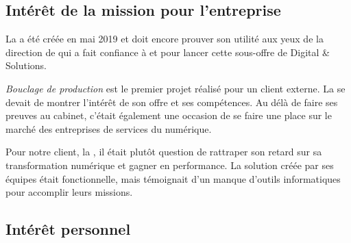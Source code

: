 

\subsection{Intérêt de la mission pour l'entreprise}


La \df a été créée en mai 2019 et doit encore prouver son utilité aux yeux de la direction de \tnp qui a fait confiance à \damien et \gil pour lancer cette sous-offre de Digital \& Solutions.

\emph{Bouclage de production} est le premier projet réalisé pour un client externe. La \df se devait de montrer l'intérêt de son offre et ses compétences. Au délà de faire ses preuves au cabinet, c'était également une occasion de se faire une place sur le marché des entreprises de services du numérique.

Pour notre client, la \sncf, il était plutôt question de rattraper son retard sur sa transformation numérique et gagner en performance. La solution créée par ses équipes était fonctionnelle, mais témoignait d'un manque d'outils informatiques pour accomplir leurs missions.

\newpage
\subsection{Intérêt personnel}

